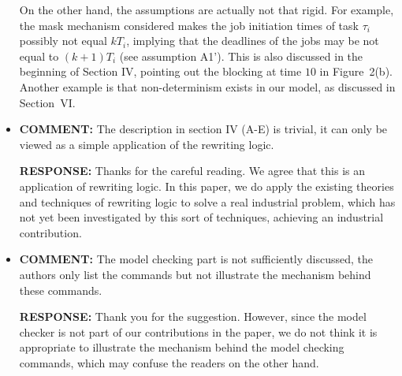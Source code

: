\documentclass[10pt,journal]{IEEEtran}
\newcommand{\hide}[1]{\ignorespaces}
\newcommand{\ANSWER}{{\bf RESPONSE: }}
\newcommand{\COMMENT}{{\bf COMMENT: }}
\begin{document}
\begin{itemize}
On the other hand, the assumptions are actually not that rigid. For
example, the mask mechanism considered makes the job initiation times
of task $\tau_i$ possibly not equal $kT_i$, implying that the
deadlines of the jobs may be not equal to $(k+1)T_i$ (see assumption
A1'). This is also discussed in the beginning of Section IV, pointing
out the blocking at time $10$ in Figure~2(b). Another example is that
non-determinism exists in our model, as discussed in Section~VI.

\item
\COMMENT The description in section IV (A-E) is trivial, it can only
be viewed as a simple application of the rewriting logic.

\ANSWER Thanks for the careful reading. We agree that this is an
application of rewriting logic. In this paper, we do apply the
existing theories and techniques of rewriting logic to solve a real
industrial problem, which has not yet been investigated by this sort
of techniques, achieving an industrial contribution.

\item
\COMMENT The model checking part is not sufficiently discussed, the
authors only list the commands but not illustrate the mechanism behind
these commands.

\ANSWER Thank you for the suggestion. However, since the model checker
is not part of our contributions in the paper, we do not think it is
appropriate to illustrate the mechanism behind the model checking
commands, which may confuse the readers on the other hand.

\end{itemize}

\hide{
\ifCLASSOPTIONcompsoc
  \section*{Acknowledgments}
\else
  \section*{Acknowledgment}
\fi

The authors would like to thank...
}

\ifCLASSOPTIONcaptionsoff
  \newpage
\fi
\end{document}
